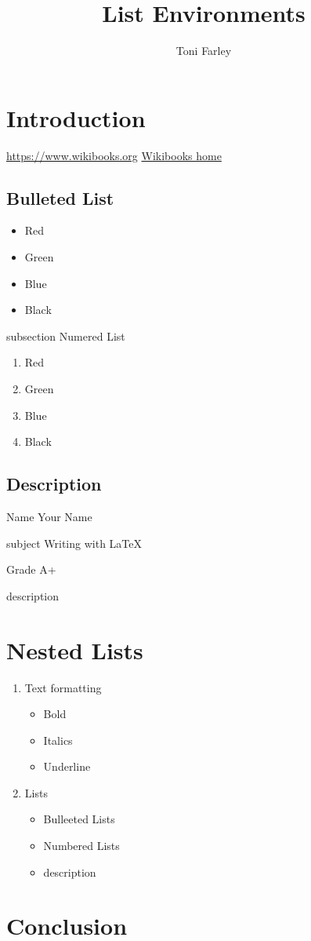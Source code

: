 \documentclass{article}
\title{List Environments}
\author{Toni Farley}
\date{}
\begin{document}
\maketitle

\section{Introduction}

\url{https://www.wikibooks.org}
\href{https://www.wikibooks.org}{Wikibooks home}

\subsection{Bulleted List}

\begin{itemize}

\item Red 
\item Green 
\item Blue
\item Black

\end{itemize}
subsection{ Numered List}

\begin{enumerate}
\item Red
\item Green
\item Blue
\item Black
\end{enumerate}

\subsection{Description}
\begin{description}
\item{Name} Your Name
\item{subject} Writing with \LaTeX
\item{Grade} A+
\item{description}
\end{description}

\section{Nested Lists}
\begin{enumerate}
\item Text formatting

\begin{itemize}
\item Bold
\item Italics
\item Underline
\end{itemize}

\item Lists

\begin{itemize}
\item Bulleeted Lists
\item Numbered Lists
\item description
\end{itemize}

\end{enumerate}

\section{Conclusion}
\end{document}

